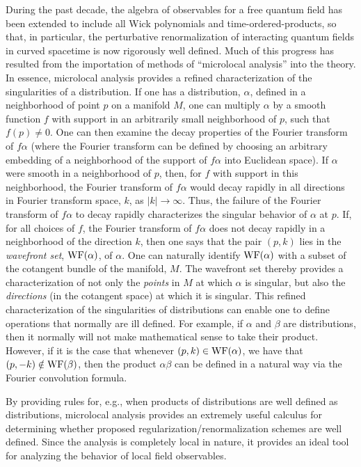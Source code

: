 During the past decade, the algebra of observables for a free quantum
field has been extended to include all Wick polynomials and
time-ordered-products, so that, in particular, the perturbative
renormalization of interacting quantum fields in curved spacetime is
now rigorously well defined. Much of this progress has resulted from
the importation of methods of ``microlocal analysis'' into the
theory. In essence, microlocal analysis provides a refined
characterization of the singularities of a distribution. If one has a
distribution, $\alpha$, defined in a neighborhood of point $p$ on a
manifold $M$, one can multiply $\alpha$ by a smooth function $f$ with
support in an arbitrarily small neighborhood of $p$, such that $f(p)
\neq 0$. One can then examine the decay properties of the Fourier
transform of $f \alpha$ (where the Fourier transform can be defined by
choosing an arbitrary embedding of a neighborhood of the support of $f
\alpha$ into Euclidean space). If $\alpha$ were smooth in a
neighborhood of $p$, then, for $f$ with support in this neighborhood,
the Fourier transform of $f \alpha$ would decay rapidly in all
directions in Fourier transform space, $k$, as $|k| \rightarrow
\infty$. Thus, the failure of the Fourier transform of $f \alpha$ to
decay rapidly characterizes the singular behavior of $\alpha$ at
$p$. If, for all choices of $f$, the Fourier transform of $f \alpha$
does not decay rapidly in a neighborhood of the direction $k$, then
one says that the pair $(p,k)$ lies in the {\it wavefront set}, ${\rm
WF}(\alpha)$, of $\alpha$. One can naturally identify ${\rm
WF}(\alpha)$ with a subset of the cotangent bundle of the manifold,
$M$. The wavefront set thereby provides a characterization of not only
the {\it points} in $M$ at which $\alpha$ is singular, but also the
{\it directions} (in the cotangent space) at which it is
singular. This refined characterization of the singularities of
distributions can enable one to define operations that normally are
ill defined. For example, if $\alpha$ and $\beta$ are distributions,
then it normally will not make mathematical sense to take their
product. However, if it is the case that whenever $(p,k) \in {\rm
WF}(\alpha)$, we have that $(p,-k) \notin {\rm WF}(\beta)$, then the
product $\alpha \beta$ can be defined in a natural way via the Fourier
convolution formula.

By providing rules for, e.g., when products of distributions are well
defined as distributions, microlocal analysis provides an extremely
useful calculus for determining whether proposed
regularization/renormalization schemes are well defined. Since the
analysis is completely local in nature, it provides an ideal tool for
analyzing the behavior of local field observables.

